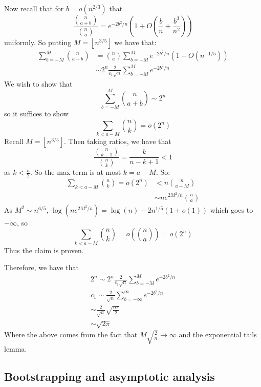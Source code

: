 \documentclass[]{article}
\theoremstyle{definition}
\numberwithin{theorem}{section}
\numberwithin{equation}{section}
\begin{document}
	Now recall that for $b = o(n^{2/3})$ that
	\begin{equation}
		\frac{\binom{n}{a + b}}{\binom{n}{a}} = e^{-2 b^2/n}(1 + O(\frac{b}{n} + \frac{b^3}{n^2}))
	\end{equation}
	uniformly. So putting $M = \left\lfloor n^{3/5}\right\rfloor$ we have that:
	\begin{align*}
		\sum_{b = - M}^M \binom{n}{a + b} &= \binom{n}{a} \sum_{b = - M}^{M}e^{-2b^2/n}( 1 + O(n^{-1/5}))\\
		&\sim 2^n \frac{2}{c_1 \sqrt{n}} \sum_{b = - M}^{M}e^{-2b^2/n}
	\end{align*}
	We wish to show that 
	\begin{equation}
		\sum_{b = - M}^M \binom{n}{a + b} \sim 2^n
	\end{equation}
	so it suffices to show
	\begin{equation}
		\sum_{k < a- M} \binom{n}{k} = o(2^n)
	\end{equation}
	Recall $M = \left\lfloor n^{3/5}\right\rfloor$. Then taking ratios, we have that
	\begin{equation}
		\frac{\binom{n}{k - 1}}{\binom{n}{k}} = \frac{k}{n - k + 1}< 1
	\end{equation}
	as $k < \frac{n}{2}$. So the max term is at most $k =  a - M$.
	So:
	\begin{align*}
	\sum_{k < a- M} \binom{n}{k} = o(2^n) &< n \binom{n}{a - M}\\
	&\sim  n e^{2M^2/n}\binom{n}{a}
\end{align*}
As $M^2 \sim n^{6/5}$, $\log(n e^{2M^2/n}) = \log(n) - 2 n^{1/5}(1 + o(1))$ which goes to $- \infty$, so 
	\begin{equation}
	\sum_{k < a- M} \binom{n}{k} = o\left(\binom{n}{a}\right) = o(2^n)
\end{equation}
Thus the claim is proven.

Therefore, we have that 
\begin{align*}
	2^n \sim 2^n \frac{2}{c_1 \sqrt{n}} \sum_{b = - M}^{M}e^{-2b^2/n}\\
	c_1 \sim \frac{2}{\sqrt{n}} \sum_{b = - \infty}^{\infty}e^{-2b^2/n}\\
	\sim \frac{2}{\sqrt{n}} \sqrt{\frac{n\pi}{2}}\\
	\sim \sqrt{2 \pi}
\end{align*}
Where the above comes from the fact that $M \sqrt{\frac{2}{n}} \rightarrow \infty$ and the exponential tails lemma.

\subsection{Bootstrapping and asymptotic analysis}
\end{document}
